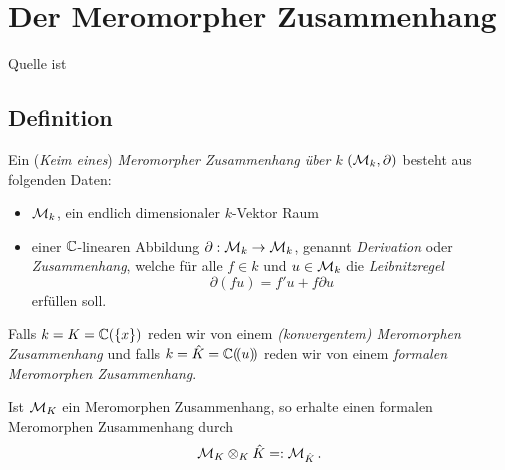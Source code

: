
\chapter{Der Meromorpher Zusammenhang}
Quelle ist \cite{sabbah_cimpa90}
\section{Definition}

\begin{defn}
  Ein (\emph{Keim eines}) \emph{Meromorpher Zusammenhang über $k$}
  $(\mathcal{M}_k,\partial)$ besteht aus folgenden Daten:
  \begin{itemize}
    \item $\mathcal{M}_k$, ein endlich dimensionaler $k$-Vektor Raum
    \item einer $\mathbb{C}$-linearen Abbildung $\partial:\mathcal{M}_k\rightarrow \mathcal{M}_k$,
      genannt \emph{Derivation} oder \emph{Zusammenhang}, welche für alle $f\in k$ und $u\in \mathcal{M}_k$ die
      \emph{Leibnitzregel}
      \begin{equation}\label{eq:Leibnitzregel}
        \partial(fu)=f'u+f\partial u
      \end{equation}
      erfüllen soll.
  \end{itemize}
  Falls $k=K=\mathbb{C}(\{x\})$ reden wir von einem \emph{(konvergentem) Meromorphen
  Zusammenhang} und falls $k=\hat K={\mathbb C (\!(u)\!)}$ reden wir von einem \emph{formalen
  Meromorphen Zusammenhang}.
\end{defn}
\begin{bem}
  Ist $\mathcal{M}_K$ ein Meromorphen Zusammenhang, so erhalte einen formalen
  Meromorphen Zusammenhang durch
  \[ \mathcal{M}_K\otimes_{K}\hat K =: \mathcal{M}_{\hat K} \,. \]
\end{bem}

